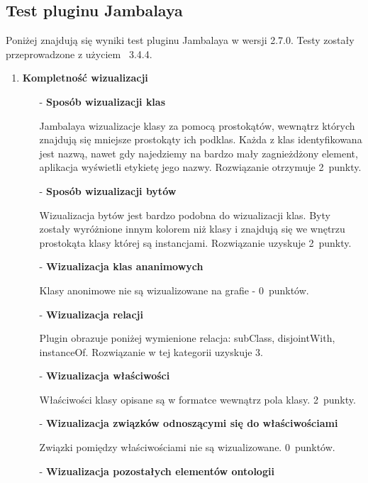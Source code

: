 \subsection*{Test pluginu Jambalaya}

Poniżej znajdują się wyniki test pluginu Jambalaya w wersji 2.7.0. Testy zostały przeprowadzone z użyciem \proteges~3.4.4.

\begin{enumerate}
 \item{\bf Kompletność wizualizacji}

  \begin{itemize}
   \item[-]{\bf Sposób wizualizacji klas}

  \nopagebreak  
Jambalaya wizualizacje klasy za pomocą prostokątów, wewnątrz których znajdują się mniejsze prostokąty ich podklas. Każda z klas identyfikowana jest nazwą,
 nawet gdy najedziemy na bardzo mały zagnieżdżony element, aplikacja wyświetli etykietę jego nazwy. Rozwiązanie otrzymuje 2~punkty.


   \item[-]{\bf Sposób wizualizacji bytów}

  \nopagebreak 
Wizualizacja bytów jest bardzo podobna do wizualizacji klas. Byty zostały wyróżnione innym kolorem niż klasy i znajdują się we wnętrzu prostokąta 
klasy której są instancjami. Rozwiązanie uzyskuje 2~punkty.


   \item[-]{\bf Wizualizacja klas ananimowych}

  \nopagebreak 
Klasy anonimowe nie są wizualizowane na grafie - 0~punktów. 


   \item[-]{\bf Wizualizacja relacji}

  \nopagebreak 
Plugin obrazuje poniżej wymienione relacja:  subClass, disjointWith, instanceOf. Rozwiązanie w tej kategorii uzyskuje 3.


 \item[-]{\bf Wizualizacja właściwości} 

  \nopagebreak
Właściwości klasy opisane są w formatce wewnątrz pola klasy. 2~punkty.
 \item[-]{\bf Wizualizacja związków odnoszącymi się do właściwościami} 

  \nopagebreak
Związki pomiędzy właściwościami nie są wizualizowane. 0~punktów.
 \item[-]{\bf Wizualizacja pozostałych elementów ontologii} 


\end{itemize}
\end{enumerate}

